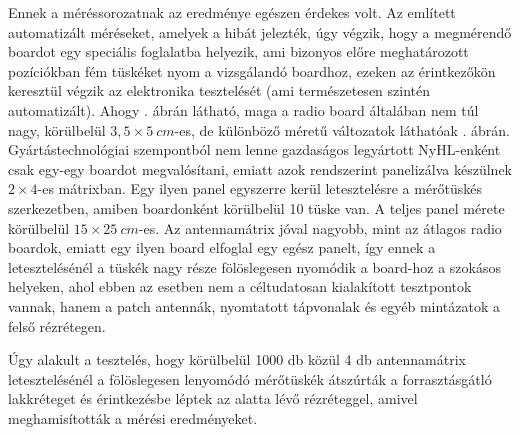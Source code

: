 %
        Ennek a méréssorozatnak az eredménye egészen érdekes volt. Az említett automatizált méréseket, amelyek a hibát jelezték, úgy végzik, hogy a megmérendő boardot egy speciális foglalatba helyezik, ami bizonyos előre meghatározott pozíciókban fém tüskéket nyom a vizsgálandó boardhoz, ezeken az érintkezőkön keresztül végzik az elektronika tesztelését (ami természetesen szintén automatizált). Ahogy . ábrán látható, maga a radio board általában nem túl nagy, körülbelül $3,5 \times \SI{5}{cm}$-es, de különböző méretű változatok láthatóak . ábrán. Gyártástechnológiai szempontból nem lenne gazdaságos legyártott NyHL-enként csak egy-egy boardot megvalósítani, emiatt azok rendszerint panelizálva készülnek $2 \times 4$-es mátrixban. Egy ilyen panel egyszerre kerül letesztelésre a mérőtüskés szerkezetben, amiben boardonként körülbelül 10 tüske van. A teljes panel mérete körülbelül $15 \times \SI{25}{cm}$-es. Az antennamátrix jóval nagyobb, mint az átlagos radio boardok, emiatt egy ilyen board elfoglal egy egész panelt, így ennek a letesztelésénél a tüskék nagy része fölöslegesen nyomódik a board-hoz a szokásos helyeken, ahol ebben az esetben nem a céltudatosan kialakított tesztpontok vannak, hanem a patch antennák, nyomtatott tápvonalak és egyéb mintázatok a felső rézrétegen.
        \par
        Úgy alakult a tesztelés, hogy körülbelül 1000 db közül 4 db antennamátrix letesztelésénél a fölöslegesen lenyomódó mérőtüskék átszúrták a forrasztásgátló lakkréteget és érintkezésbe léptek az alatta lévő rézréteggel, amivel meghamisították a mérési eredményeket.




